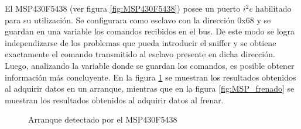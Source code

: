 \documentclass[main]{subfiles}
\begin{document}
El MSP430F5438 (ver figura \ref{fig:MSP430F5438}) posee un puerto $i^2c$ habilitado para su utilizaci\'on. Se configurara como esclavo con la direcci\'on 0x68 y se guardan en una variable los comandos recibidos en el bus. De este modo se logra independizarse de los problemas que pueda introducir el sniffer y se obtiene exactamente el comando transmitido al esclavo presente en dicha direcci\'on.\\

Luego, analizando la variable donde se guardan los comandos, es posible obtener informaci\'on m\'as concluyente. En la figura \ref{fig:MSP_arranque} se muestran los resultados obtenidos al adquirir datos en un arranque, mientras que en la figura \ref{fig:MSP_frenado} se muestran los resultados obtenidos al adquirir datos al frenar.

\begin{figure} [h!]
\centering
  \caption{Arranque detectado por el MSP430F5438}
  \label{fig:MSP_arranque}
\end{figure}
\end{document}
